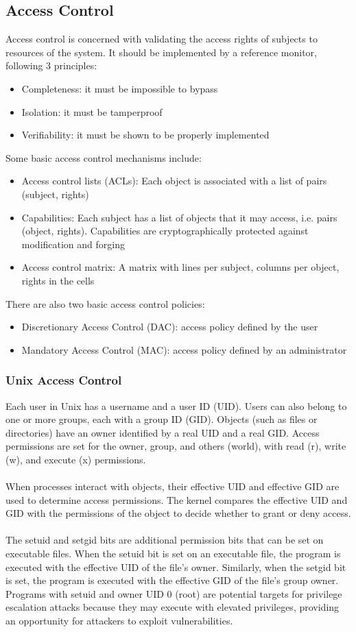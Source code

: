 \documentclass[10pt,a4paper]{report}
\begin{document}
\subsection{Access Control}
Access control is concerned with validating the access rights of subjects to resources of the system. It should be implemented by a reference monitor, following 3 principles:
\begin{itemize}
\item Completeness: it must be impossible to bypass
\item Isolation: it must be tamperproof
\item Verifiability: it must be shown to be properly implemented
\end{itemize}
Some basic access control mechanisms include:
\begin{itemize}
\item Access control lists (ACLs): Each object is associated with a list of pairs (subject, rights)
\item Capabilities: Each subject has a list of objects that it may access, i.e. pairs (object, rights). Capabilities are cryptographically protected against modification and forging
\item Access control matrix: A matrix with lines per subject, columns per object, rights in the cells
\end{itemize}
There are also two basic access control policies:
\begin{itemize}
\item Discretionary Access Control (DAC): access policy defined by the user
\item Mandatory Access Control (MAC): access policy defined by an administrator
\end{itemize}
\subsubsection{Unix Access Control}
Each user in Unix has a username and a user ID (UID). Users can also belong to one or more groups, each with a group ID (GID). Objects (such as files or directories) have an owner identified by a real UID and a real GID. Access permissions are set for the owner, group, and others (world), with read (r), write (w), and execute (x) permissions.\\
\\
When processes interact with objects, their effective UID and effective GID are used to determine access permissions. The kernel compares the effective UID and GID with the permissions of the object to decide whether to grant or deny access.\\
\\
The setuid and setgid bits are additional permission bits that can be set on executable files. When the setuid bit is set on an executable file, the program is executed with the effective UID of the file's owner. Similarly, when the setgid bit is set, the program is executed with the effective GID of the file's group owner. Programs with setuid and owner UID 0 (root) are potential targets for privilege escalation attacks because they may execute with elevated privileges, providing an opportunity for attackers to exploit vulnerabilities.
\end{document}

